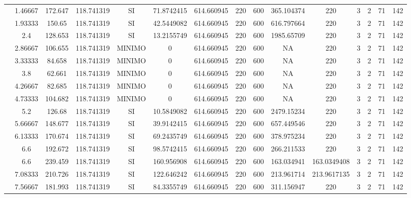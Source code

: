 \begin{table}[H]
{\begin{tabular}{|c|c|c|c|c|c|c|c|c|c|c|c|c|c|c|}
\cline{2-15}    & 1.46667 & 172.647 & 118.741319 & SI  & 71.8742415 & 614.660945 & 220 & 600 & 365.104374 & 220 & 3   & 2   & 71  & 142 \bigstrut\\
\cline{2-15}    & 1.93333 & 150.65 & 118.741319 & SI  & 42.5449082 & 614.660945 & 220 & 600 & 616.797664 & 220 & 3   & 2   & 71  & 142 \bigstrut\\
\cline{2-15}    & 2.4 & 128.653 & 118.741319 & SI  & 13.2155749 & 614.660945 & 220 & 600 & 1985.65709 & 220 & 3   & 2   & 71  & 142 \bigstrut\\
\cline{2-15}    & 2.86667 & 106.655 & 118.741319 & MINIMO & 0   & 614.660945 & 220 & 600 & NA  & 220 & 3   & 2   & 71  & 142 \bigstrut\\
\cline{2-15}    & 3.33333 & 84.658 & 118.741319 & MINIMO & 0   & 614.660945 & 220 & 600 & NA  & 220 & 3   & 2   & 71  & 142 \bigstrut\\
\cline{2-15}    & 3.8 & 62.661 & 118.741319 & MINIMO & 0   & 614.660945 & 220 & 600 & NA  & 220 & 3   & 2   & 71  & 142 \bigstrut\\
\cline{2-15}    & 4.26667 & 82.685 & 118.741319 & MINIMO & 0   & 614.660945 & 220 & 600 & NA  & 220 & 3   & 2   & 71  & 142 \bigstrut\\
\cline{2-15}    & 4.73333 & 104.682 & 118.741319 & MINIMO & 0   & 614.660945 & 220 & 600 & NA  & 220 & 3   & 2   & 71  & 142 \bigstrut\\
\cline{2-15}    & 5.2 & 126.68 & 118.741319 & SI  & 10.5849082 & 614.660945 & 220 & 600 & 2479.15234 & 220 & 3   & 2   & 71  & 142 \bigstrut\\
\cline{2-15}    & 5.66667 & 148.677 & 118.741319 & SI  & 39.9142415 & 614.660945 & 220 & 600 & 657.449546 & 220 & 3   & 2   & 71  & 142 \bigstrut\\
\cline{2-15}    & 6.13333 & 170.674 & 118.741319 & SI  & 69.2435749 & 614.660945 & 220 & 600 & 378.975234 & 220 & 3   & 2   & 71  & 142 \bigstrut\\
\cline{2-15}    & 6.6 & 192.672 & 118.741319 & SI  & 98.5742415 & 614.660945 & 220 & 600 & 266.211533 & 220 & 3   & 2   & 71  & 142 \bigstrut\\
\cline{2-15}    & 6.6 & 239.459 & 118.741319 & SI  & 160.956908 & 614.660945 & 220 & 600 & 163.034941 & 163.0349408 & 3   & 2   & 71  & 142 \bigstrut\\
\cline{2-15}    & 7.08333 & 210.726 & 118.741319 & SI  & 122.646242 & 614.660945 & 220 & 600 & 213.961714 & 213.9617135 & 3   & 2   & 71  & 142 \bigstrut\\
\cline{2-15}    & 7.56667 & 181.993 & 118.741319 & SI  & 84.3355749 & 614.660945 & 220 & 600 & 311.156947 & 220 & 3   & 2   & 71  & 142 \bigstrut\\

\end{tabular}}
\end{table}
